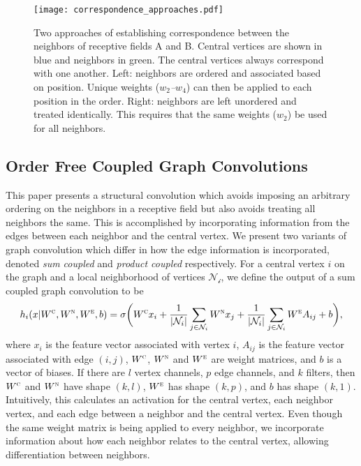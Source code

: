 \begin{figure}
	\centering
	\texttt{[image: correspondence\_approaches.pdf]}
	\caption{Two approaches of establishing correspondence between the neighbors of receptive fields A and B. Central vertices are shown in blue and neighbors in green. The central vertices always correspond with one another. Left: neighbors are ordered and associated based on position. Unique weights (\textit{$w_2$--$w_4$}) can then be applied to each position in the order. Right: neighbors are left unordered and treated identically. This requires that the same weights (\textit{$w_2$}) be used for all neighbors.}
	\label{fig:correspondence_approaches}
\end{figure}


\subsection{Order Free Coupled Graph Convolutions}
This paper presents a structural convolution which avoids imposing an arbitrary ordering on the neighbors in a receptive field but also avoids treating all neighbors the same.
This is accomplished by incorporating information from the edges between each neighbor and the central vertex.
We present two variants of graph convolution which differ in how the edge information is incorporated, denoted \textit{sum coupled} and \textit{product coupled} respectively.
For a central vertex $i$ on the graph and a local neighborhood of vertices $\mathcal{N_i}$, we define the output of a sum coupled graph convolution to be
\begin{equation}
h_i(x | W^\textsc{c}, W^\textsc{n}, W^\textsc{e}, b) = \sigma \bigg( W^{\textsc{c}} x_i + \frac{1}{|\mathcal{N}_i|}\sum_{j \in \mathcal{N}_i} W^{\textsc{n}} x_j + \frac{1}{|\mathcal{N}_i|}\sum_{j \in \mathcal{N}_i} W^{\textsc{e}} A_{ij} + b \bigg),
\label{eq:sum_coupling}
\end{equation}
where $x_i$ is the feature vector associated with vertex $i$, $A_{ij}$ is the feature vector associated with edge $(i, j)$, $W^\textsc{c}$, $W^\textsc{n}$ and $W^\textsc{e}$ are weight matrices, and $b$ is a vector of biases. 
If there are $l$ vertex channels, $p$ edge channels, and $k$ filters, then $W^\textsc{c}$ and $W^\textsc{n}$ have shape $(k, l)$, $W^\textsc{e}$ has shape $(k, p)$, and $b$ has shape $(k, 1)$.
Intuitively, this calculates an activation for the central vertex, each neighbor vertex, and each edge between a neighbor and the central vertex.
Even though the same weight matrix is being applied to every neighbor, we incorporate information about how each neighbor relates to the central vertex, allowing differentiation between neighbors. 


